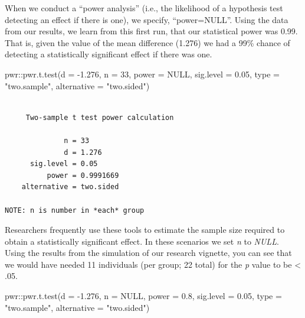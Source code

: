\documentclass[
  11pt,
]{book}
\newenvironment{Shaded}{\begin{snugshade}}{\end{snugshade}}
\newcommand{\AttributeTok}[1]{\textcolor[rgb]{0.77,0.63,0.00}{#1}}
\newcommand{\ConstantTok}[1]{\textcolor[rgb]{0.00,0.00,0.00}{#1}}
\newcommand{\DecValTok}[1]{\textcolor[rgb]{0.00,0.00,0.81}{#1}}
\newcommand{\FloatTok}[1]{\textcolor[rgb]{0.00,0.00,0.81}{#1}}
\newcommand{\FunctionTok}[1]{\textcolor[rgb]{0.00,0.00,0.00}{#1}}
\newcommand{\NormalTok}[1]{#1}
\newcommand{\SpecialCharTok}[1]{\textcolor[rgb]{0.00,0.00,0.00}{#1}}
\newcommand{\StringTok}[1]{\textcolor[rgb]{0.31,0.60,0.02}{#1}}
\begin{document}
When we conduct a ``power analysis'' (i.e., the likelihood of a hypothesis test detecting an effect if there is one), we specify, ``power=NULL''. Using the data from our results, we learn from this first run, that our statistical power was 0.99. That is, given the value of the mean difference (1.276) we had a 99\% chance of detecting a statistically significant effect if there was one.

\begin{Shaded}
\begin{Highlighting}[]
\NormalTok{pwr}\SpecialCharTok{::}\FunctionTok{pwr.t.test}\NormalTok{(}\AttributeTok{d =} \SpecialCharTok{{-}}\FloatTok{1.276}\NormalTok{, }\AttributeTok{n =} \DecValTok{33}\NormalTok{, }\AttributeTok{power =} \ConstantTok{NULL}\NormalTok{, }\AttributeTok{sig.level =} \FloatTok{0.05}\NormalTok{, }\AttributeTok{type =} \StringTok{"two.sample"}\NormalTok{,}
    \AttributeTok{alternative =} \StringTok{"two.sided"}\NormalTok{)}
\end{Highlighting}
\end{Shaded}

\begin{verbatim}

     Two-sample t test power calculation 

              n = 33
              d = 1.276
      sig.level = 0.05
          power = 0.9991669
    alternative = two.sided

NOTE: n is number in *each* group
\end{verbatim}

Researchers frequently use these tools to estimate the sample size required to obtain a statistically significant effect. In these scenarios we set \emph{n} to \emph{NULL}. Using the results from the simulation of our research vignette, you can see that we would have needed 11 individuals (per group; 22 total) for the \emph{p} value to be \textless{} .05.

\begin{Shaded}
\begin{Highlighting}[]
\NormalTok{pwr}\SpecialCharTok{::}\FunctionTok{pwr.t.test}\NormalTok{(}\AttributeTok{d =} \SpecialCharTok{{-}}\FloatTok{1.276}\NormalTok{, }\AttributeTok{n =} \ConstantTok{NULL}\NormalTok{, }\AttributeTok{power =} \FloatTok{0.8}\NormalTok{, }\AttributeTok{sig.level =} \FloatTok{0.05}\NormalTok{, }\AttributeTok{type =} \StringTok{"two.sample"}\NormalTok{,}
    \AttributeTok{alternative =} \StringTok{"two.sided"}\NormalTok{)}
\end{Highlighting}
\end{Shaded}
\end{document}
